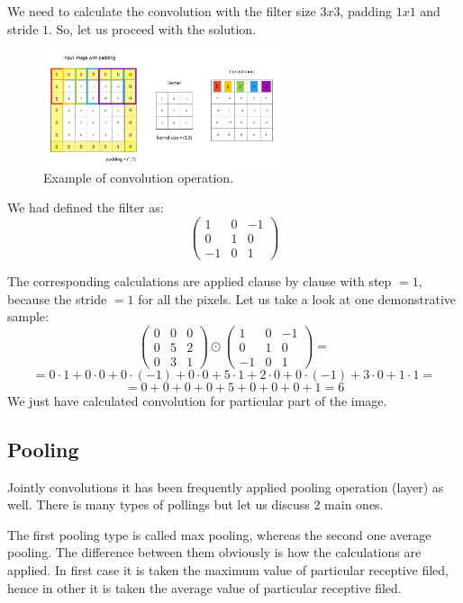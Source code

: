 We need to calculate the convolution with the filter size $3x3$, padding $1x1$ and stride $1$. So, let us proceed with the solution. 
\begin{figure}[h]
    \centering \includegraphics[width=7cm]{images/convolution.jpg}
    \caption {Example of convolution operation.}
\end{figure}

We had defined the filter as: 
\[ \begin{pmatrix} 1 & 0 & -1 \\ 0 & 1 & 0 \\ -1 & 0 & 1 \end{pmatrix} \]

The corresponding calculations are applied clause by clause with step $= 1$, because the stride $= 1$ for all the pixels. Let us take a look at one demonstrative sample:   
\[ \begin{pmatrix} 0 & 0 & 0 \\ 0 & 5 & 2 \\ 0 & 3 & 1 \end{pmatrix} \odot \begin{pmatrix} 1 & 0 & -1 \\ 0 & 1 & 0 \\ -1 & 0 & 1 \end{pmatrix} = \]
\[ = 0 \cdot 1 + 0 \cdot 0 + 0 \cdot (-1) + 0 \cdot 0 + 5 \cdot 1 + 2 \cdot 0 + 0 \cdot (-1) + 3 \cdot 0 + 1 \cdot 1 = \] 
\[ = 0 + 0 + 0 + 0 + 5 + 0 + 0 + 0 + 1= 6 \]
We just have calculated convolution for particular part of the image. 

\subsection{Pooling}
Jointly convolutions it has been frequently applied pooling operation (layer) as well. There is many types of pollings but let us discuss 2 main ones. 

The first pooling type is called max pooling, whereas the second one average pooling. The difference between them obviously is how the calculations are applied. In first case it is taken the maximum value of particular receptive filed, hence in other it is taken the average value of particular receptive filed.

